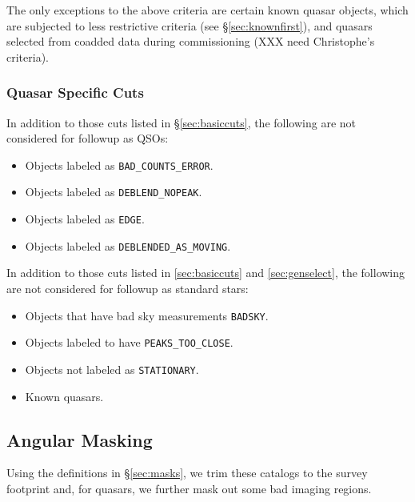 \documentclass[12pt,preprint]{aastex}
\begin{document}
The only exceptions to the above criteria are certain known quasar objects,
which are subjected to less restrictive criteria (see \S \ref{sec:knownfirst}),
and quasars selected from coadded data during commissioning (XXX need
Christophe's criteria).

\subsubsection{Quasar Specific Cuts} \label{sec:cutqso}

In addition to those cuts listed in \S \ref{sec:basiccuts}, the following are
not considered for followup as QSOs:

\begin{itemize}

    \item Objects labeled as \texttt{BAD\_COUNTS\_ERROR}.
    \item Objects labeled as \texttt{DEBLEND\_NOPEAK}.
    \item Objects labeled as \texttt{EDGE}.
    \item Objects labeled as \texttt{DEBLENDED\_AS\_MOVING}.

\end{itemize}


 \label{sec:cutstd}

In addition to those cuts listed in \ref{sec:basiccuts} and
\ref{sec:genselect}, the following are not considered for followup as standard
stars:

\begin{itemize}

    \item Objects that have bad sky measurements \texttt{BADSKY}.
    \item Objects labeled to have \texttt{PEAKS\_TOO\_CLOSE}.
    \item Objects not labeled as \texttt{STATIONARY}.
    \item Known quasars.
   
\end{itemize}



\subsection{Angular Masking}

Using the definitions in \S \ref{sec:masks}, we trim these catalogs to the
survey footprint and, for quasars, we further mask out some bad imaging
regions.
\end{document}
